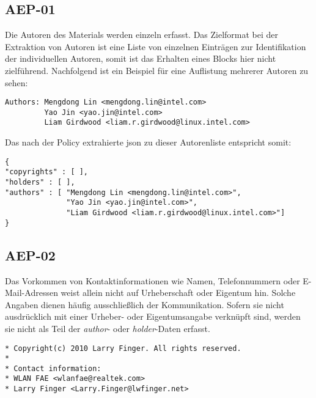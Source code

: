 
\subsection{AEP-01}\label{subsec:aep-01}

Die Autoren des Materials werden einzeln erfasst.
Das Zielformat bei der Extraktion von Autoren ist eine Liste von einzelnen Einträgen zur Identifikation der individuellen Autoren, somit ist das Erhalten eines Blocks hier nicht zielführend.
Nachfolgend ist ein Beispiel für eine Auflistung mehrerer Autoren zu sehen:

\begin{lstlisting}[numbers=none, keepspaces=true]
Authors: Mengdong Lin <mengdong.lin@intel.com>
         Yao Jin <yao.jin@intel.com>
         Liam Girdwood <liam.r.girdwood@linux.intel.com>
\end{lstlisting}

Das nach der Policy extrahierte \gls{json} zu dieser Autorenliste entspricht somit:

\begin{lstlisting}[numbers=none, keepspaces=true]
{
"copyrights" : [ ],
"holders" : [ ],
"authors" : [ "Mengdong Lin <mengdong.lin@intel.com>",
              "Yao Jin <yao.jin@intel.com>",
              "Liam Girdwood <liam.r.girdwood@linux.intel.com>"]
}
\end{lstlisting}


\subsection{AEP-02}\label{subsec:aep-02}

Das Vorkommen von Kontaktinformationen wie Namen, Telefonnummern oder E-Mail-Adressen weist allein nicht auf Urheberschaft oder Eigentum hin.
Solche Angaben dienen häufig ausschließlich der Kommunikation.
Sofern sie nicht ausdrücklich mit einer Urheber- oder Eigentumsangabe verknüpft sind, werden sie nicht als Teil der \textit{author}- oder \textit{holder}-Daten erfasst.

\begin{lstlisting}[numbers=none, keepspaces=true]
* Copyright(c) 2010 Larry Finger. All rights reserved.
*
* Contact information:
* WLAN FAE <wlanfae@realtek.com>
* Larry Finger <Larry.Finger@lwfinger.net>
\end{lstlisting}

